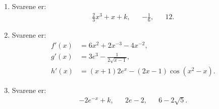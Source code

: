 \begin{enumerate}
	\item Svarene er:
	\begin{align*}
	\frac{2}{3}x^3+x+k,&& -\frac{1}{6},&& 12.
	\end{align*}
	
	
	\item Svarene er:
	\begin{align*}
	f'(x)&=6x^2+2x^{-3}-4x^{-2},\\ g'(x)&=3e^3-\frac{1}{2\sqrt{x-1}},\\ h'(x)&=(x+1)2e^x-(2x-1)\cos(x^2-x).
	\end{align*}
	
	\item Svarene er:
	\begin{align*}
	-2e^{-x}+k,&& 2e-2, && 6-2\sqrt{5}.
	\end{align*}
\end{enumerate}